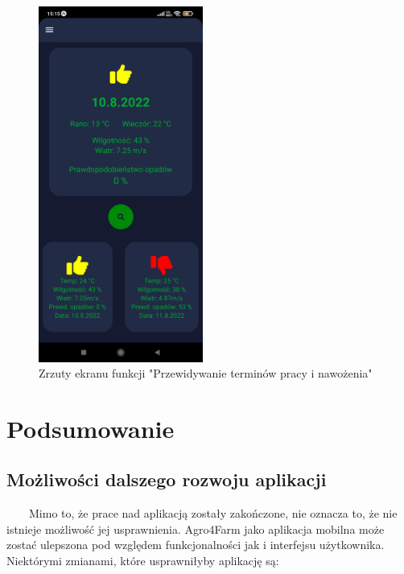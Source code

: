 \documentclass[a4paper,12pt,oneside]{book}
\begin{document}
		\begin{figure}[H]
			\centering
			\includegraphics[width=0.48\textwidth]{grafika/pre.jpg}
			\caption{Zrzuty ekranu funkcji "Przewidywanie terminów pracy i nawożenia"}
		\end{figure}
		
	\newpage
	\chapter{Podsumowanie}
	\section{Możliwości dalszego rozwoju aplikacji}
	\ \ \ \
	Mimo to, że prace nad aplikacją zostały zakończone, nie oznacza to, że nie istnieje możliwość jej usprawnienia. Agro4Farm jako aplikacja mobilna może zostać ulepszona pod względem funkcjonalności jak i interfejsu użytkownika. Niektórymi zmianami, które usprawniłyby aplikację są:
	
\end{document}
